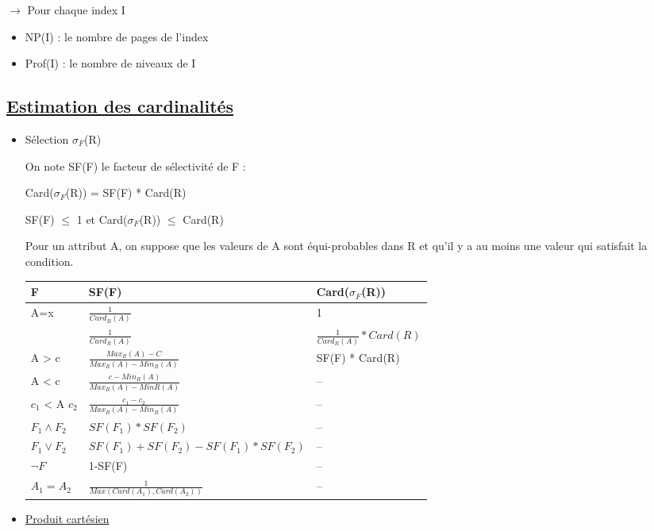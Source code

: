 \documentclass{article}
\begin{document}
$\rightarrow$ Pour chaque index I 
\begin{itemize}\renewcommand{\labelitemi}{$\bullet$}
	\item NP(I) : le nombre de pages de l'index
	\item Prof(I) : le nombre de niveaux de I
\end{itemize}

\subsection*{\underline{Estimation des cardinalités}}

\begin{itemize}\renewcommand{\labelitemi}{$\bullet$}
	\item Sélection $\sigma_{F}$(R)

On note SF(F) le facteur de sélectivité de F : 

Card($\sigma_{F}$(R)) = SF(F) * Card(R)

SF(F) $\leq$ 1 et Card($\sigma_{F}$(R)) $\leq$  Card(R)

Pour un attribut A, on suppose que les valeurs de A sont équi-probables dans R et qu'il y a au moins une valeur qui satisfait la condition.


\begin{tabular}{|p{2cm}|p{4cm}|p{4cm}|}
\hline
F & SF(F) & Card($\sigma_{F}$(R)) \\
\hline
\multirow{2}{3cm}{A=x} & $\frac{1}{Card_{R}(A)}$ & 1 \\
\cline{2-3}
& $\frac{1}{Card_{R}(A)}$ & $\frac{1}{Card_{R}(A)} * Card(R)$ \\
\hline
A > c & $\frac{Max_{R}(A)-C}{Max_{R}(A)-Min_{R}(A)}$ & SF(F) * Card(R) \\
\hline
A < c & $\frac{c - Min_{R}(A)}{Max_{R}(A) - Min{R}(A)}$ & -- \\
\hline
$c_{1}$ < A $c_{2}$ & $\frac{c_{1} - c_{2}}{Max_{R}(A) - Min_{R}(A)}$ & -- \\
\hline 
$F_{1} \wedge F_{2}$ & $SF(F_{1}) * SF(F_{2})$ & -- \\
\hline
$F_{1} \vee F_{2}$ & $SF(F_{1}) + SF(F_{2}) - SF(F_{1}) * SF(F_{2})$ & -- \\
\hline
$\neg F$ & 1-SF(F) & -- \\
\hline
$A_{1} = A_{2}$ & $\frac{1}{Max(Card(A_{1}), Card(A_{2}))}$ & -- \\
\hline
\end{tabular}

	\item \underline{Produit cartésien}


\end{itemize}
\end{document}

